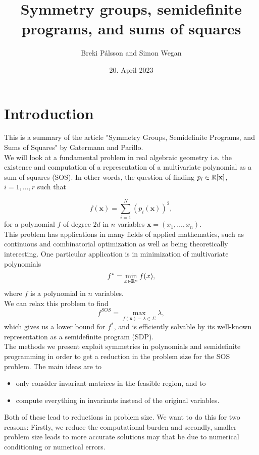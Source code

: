 \documentclass[]{article}
\begin{document}
\title{Symmetry groups, semidefinite programs, and sums of squares}
\author{Breki Pálsson and Simon Wegan}
\date{20. April 2023}

\maketitle

\section*{Introduction}
This is a summary of the article "Symmetry Groups, Semidefinite Programs, and Sums of Squares" \cite{Gatermann_2004} by Gatermann and Parillo.\\

We will look at a fundamental problem in real algebraic geometry i.e. the existence and computation of a
representation of a multivariate polynomial as a sum of squares (SOS). In other words, the
question of finding $p_i \in \mathbb R[\mathbf{x}]$, $i = 1, \ldots, r$ such that

\[
    f(\mathbf{x}) = \sum_{i=1}^{N}(p_i(\mathbf{x}))^2,
\]
for a polynomial $f$ of degree $2d$ in $n$ variables $\mathbf{x}=(x_1,\ldots,x_n)$.\\
This problem has applications in many fields of applied mathematics, such as continuous and combinatorial optimization as well as being theoretically interesting. 
One particular application is in minimization of multivariate polynomials
\[
    f^\ast=\min_{x\in\mathbb R^n}f(x),
\]
where $f$ is a polynomial in $n$ variables.\\
We can relax this problem to find 
\[
    f^{SOS}=\max_{f(\mathbf{x})-\lambda \in \Sigma}\lambda,
\]
which gives us a lower bound for $f^\ast$, and is efficiently solvable by its well-known representation as a semidefinite program (SDP).\\

The methods we present exploit symmetries in polynomials and semidefinite programming in order to get a reduction in the problem size for the SOS problem. 
The main ideas are to
\begin{itemize}
    \item only consider invariant matrices in the feasible region, and to
    \item compute everything in invariants instead of the original variables.
\end{itemize}
Both of these lead to reductions in problem size.
We want to do this for two reasons: Firstly, we reduce the computational burden and secondly, smaller problem size leads to more accurate solutions may that be due to numerical conditioning or numerical errors.\\
\end{document}

